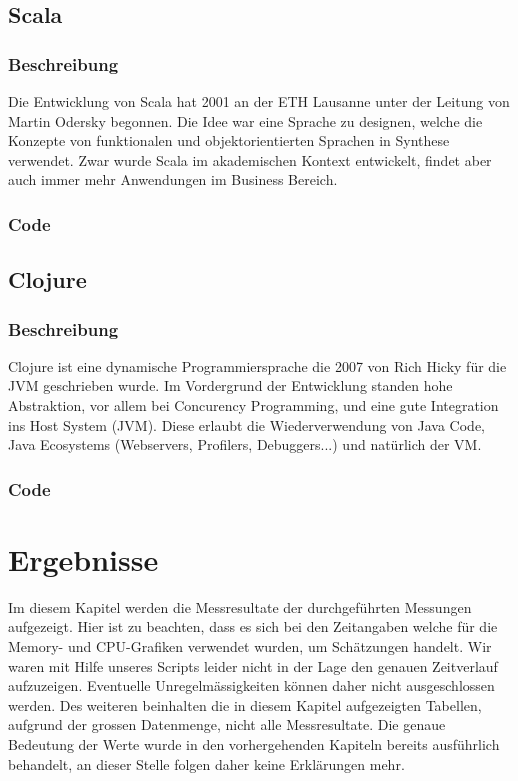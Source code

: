 \documentclass{fancydocument}
\begin{document}


\subsection{Scala}

\subsubsection{Beschreibung}

Die Entwicklung von Scala hat 2001 an der ETH Lausanne unter der Leitung von Martin
Odersky begonnen. Die Idee war eine Sprache zu designen, welche die
Konzepte von funktionalen und objektorientierten Sprachen in Synthese
verwendet. Zwar wurde Scala im akademischen Kontext entwickelt, findet
aber auch immer mehr Anwendungen im Business Bereich.

\subsubsection{Code}



\subsection{Clojure}
\subsubsection{Beschreibung}

Clojure ist eine dynamische Programmiersprache die 2007 von Rich Hicky
für die JVM geschrieben wurde. Im Vordergrund der Entwicklung standen
hohe Abstraktion, vor allem bei Concurency Programming, und eine gute
Integration ins Host System (JVM). Diese erlaubt die Wiederverwendung von
Java Code, Java Ecosystems (Webservers, Profilers, Debuggers...) und natürlich der VM.

\subsubsection{Code}


\section{Ergebnisse}
Im diesem Kapitel werden die Messresultate der durchgeführten Messungen aufgezeigt. Hier ist zu beachten, dass es sich bei den Zeitangaben welche für die Memory- und CPU-Grafiken verwendet wurden, um Schätzungen handelt. Wir waren mit Hilfe unseres Scripts leider nicht in der Lage den genauen Zeitverlauf aufzuzeigen. Eventuelle Unregelmässigkeiten können daher nicht ausgeschlossen werden. Des weiteren beinhalten die in diesem Kapitel aufgezeigten Tabellen, aufgrund der grossen Datenmenge, nicht alle Messresultate. Die genaue Bedeutung der Werte wurde in den vorhergehenden Kapiteln bereits ausführlich behandelt, an dieser Stelle folgen daher keine Erklärungen mehr.
\end{document}
